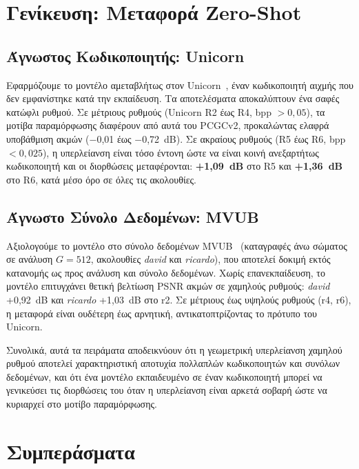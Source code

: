 \section{Γενίκευση: Μεταφορά Zero-Shot}

\subsection{Άγνωστος Κωδικοποιητής: Unicorn}

Εφαρμόζουμε το μοντέλο αμεταβλήτως στον Unicorn~\cite{wang2025unicorn},
έναν κωδικοποιητή αιχμής που δεν εμφανίστηκε κατά την εκπαίδευση.
Τα αποτελέσματα αποκαλύπτουν ένα σαφές κατώφλι ρυθμού.
Σε μέτριους ρυθμούς (Unicorn R2 έως R4, bpp $> 0{,}05$), τα μοτίβα παραμόρφωσης
διαφέρουν από αυτά του PCGCv2, προκαλώντας ελαφρά υποβάθμιση ακμών
($-$0,01 έως $-$0,72~dB).
Σε ακραίους ρυθμούς (R5 έως R6, bpp $< 0{,}025$), η υπερλείανση είναι τόσο έντονη
ώστε να είναι κοινή ανεξαρτήτως κωδικοποιητή και οι διορθώσεις μεταφέρονται:
\textbf{+1,09~dB} στο R5 και \textbf{+1,36~dB} στο R6, κατά μέσο όρο σε όλες τις
ακολουθίες.

\subsection{Άγνωστο Σύνολο Δεδομένων: MVUB}

Αξιολογούμε το μοντέλο στο σύνολο δεδομένων MVUB~\cite{loop2016mvub} (καταγραφές
άνω σώματος σε ανάλυση $G=512$, ακολουθίες \textit{david} και \textit{ricardo}),
που αποτελεί δοκιμή εκτός κατανομής ως προς ανάλυση και σύνολο δεδομένων.
Χωρίς επανεκπαίδευση, το μοντέλο επιτυγχάνει θετική βελτίωση PSNR ακμών
σε χαμηλούς ρυθμούς: \textit{david} +0,92~dB και \textit{ricardo} +1,03~dB στο r2.
Σε μέτριους έως υψηλούς ρυθμούς (r4, r6), η μεταφορά είναι ουδέτερη έως αρνητική,
αντικατοπτρίζοντας το πρότυπο του Unicorn.

Συνολικά, αυτά τα πειράματα αποδεικνύουν ότι η γεωμετρική υπερλείανση χαμηλού
ρυθμού αποτελεί χαρακτηριστική αποτυχία πολλαπλών κωδικοποιητών και συνόλων
δεδομένων, και ότι ένα μοντέλο εκπαιδευμένο σε έναν κωδικοποιητή μπορεί να
γενικεύσει τις διορθώσεις του όταν η υπερλείανση είναι αρκετά σοβαρή ώστε να
κυριαρχεί στο μοτίβο παραμόρφωσης.

\section{Συμπεράσματα}

